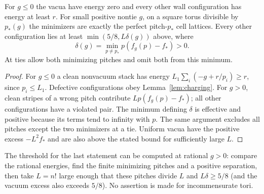 \begin{corollary}\label{cor:selection}
For $g\leq0$ the vacua have energy zero and every other wall
configuration has energy at least $r$. For small positive nontie $g$,
on a square torus divisible by $p_*(g)$ the minimizers are exactly the
perfect pitch-$p_*$ cell lattices. Every other configuration lies at
least $\min(5/8,L\delta(g))$ above, where
\[
 \delta(g)=\min_{p\ne p_*}p(f_g(p)-f_*)>0.
\]
At ties allow both minimizing pitches and omit both from this minimum.
\end{corollary}
\begin{proof}
For $g\leq0$ a clean nonvacuum stack has energy
$L_1\sum_i(-g+r/p_i)\geq r$, since $p_i\leq L_1$.
Defective configurations obey Lemma~\ref{lem:charging}. For $g>0$,
clean stripes of a wrong pitch contribute $Lp(f_g(p)-f_*)$; all
other configurations have a violated pair. The minimum defining
$\delta$ is effective and positive because its terms tend to infinity
with $p$. The same argument excludes all pitches except the two
minimizers at a tie. Uniform vacua have the positive excess
$-L^2f_*$ and are also above the stated bound for sufficiently large $L$.
\end{proof}

The threshold for the last statement can be computed at rational
$g>0$: compare the rational energies, find the finite minimizing
pitches and a positive separation, then take $L=n!$ large enough that
these pitches divide $L$ and $L\delta\geq5/8$ (and the vacuum excess
also exceeds $5/8$). No assertion is made for incommensurate tori.
